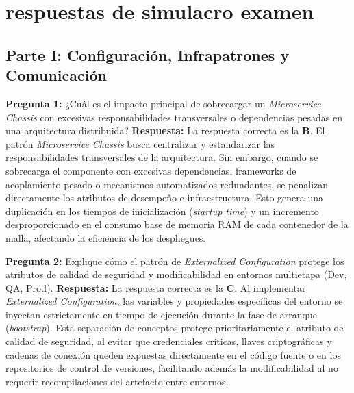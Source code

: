 \section{respuestas de simulacro examen}

\subsection*{Parte I: Configuración, Infrapatrones y Comunicación}

\noindent\textbf{Pregunta 1:} ¿Cuál es el impacto principal de sobrecargar un \textit{Microservice Chassis} con excesivas responsabilidades transversales o dependencias pesadas en una arquitectura distribuida?
\newline
\textbf{Respuesta:} La respuesta correcta es la \textbf{B}. El patrón \textit{Microservice Chassis} busca centralizar y estandarizar las responsabilidades transversales de la arquitectura. Sin embargo, cuando se sobrecarga el componente con excesivas dependencias, frameworks de acoplamiento pesado o mecanismos automatizados redundantes, se penalizan directamente los atributos de desempeño e infraestructura. Esto genera una duplicación en los tiempos de inicialización (\textit{startup time}) y un incremento desproporcionado en el consumo base de memoria RAM de cada contenedor de la malla, afectando la eficiencia de los despliegues.

\vspace{4mm}

\noindent\textbf{Pregunta 2:} Explique cómo el patrón de \textit{Externalized Configuration} protege los atributos de calidad de seguridad y modificabilidad en entornos multietapa (Dev, QA, Prod).
\newline
\textbf{Respuesta:} La respuesta correcta es la \textbf{C}. Al implementar \textit{Externalized Configuration}, las variables y propiedades específicas del entorno se inyectan estrictamente en tiempo de ejecución durante la fase de arranque (\textit{bootstrap}). Esta separación de conceptos protege prioritariamente el atributo de calidad de seguridad, al evitar que credenciales críticas, llaves criptográficas y cadenas de conexión queden expuestas directamente en el código fuente o en los repositorios de control de versiones, facilitando además la modificabilidad al no requerir recompilaciones del artefacto entre entornos.

\vspace{4mm}

